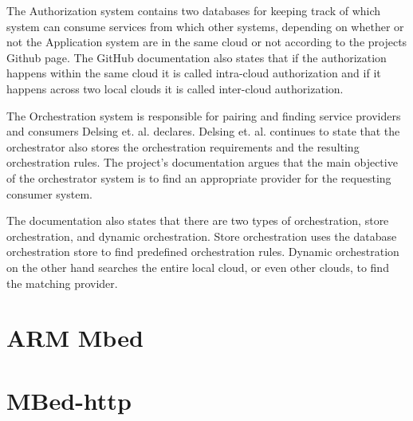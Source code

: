 The Authorization system contains two databases for keeping track of which system can consume services from which other systems, depending on whether or not the Application system are in the same cloud or not according to the projects Github page.\cite{Github2021}
The GitHub documentation also states that if the authorization happens within the same cloud it is called intra-cloud authorization and if it happens across two local clouds it is called inter-cloud authorization.\cite{Github2021}

The Orchestration system is responsible for pairing and finding service providers and consumers Delsing et. al. declares.\cite{Delsing2017} 
Delsing et. al. continues to state that the orchestrator also stores the orchestration requirements and the resulting orchestration rules.\cite{Delsing2017} 
The project's documentation argues that the main objective of the orchestrator system is to find an appropriate provider for the requesting consumer system.\cite{Github2021}

The documentation also states that there are two types of orchestration, store orchestration, and dynamic orchestration.
Store orchestration uses the database orchestration store to find predefined orchestration rules.
Dynamic orchestration on the other hand searches the entire local cloud, or even other clouds, to find the matching provider.\cite{Github2021}
\section{ARM Mbed}
\section{MBed-http}